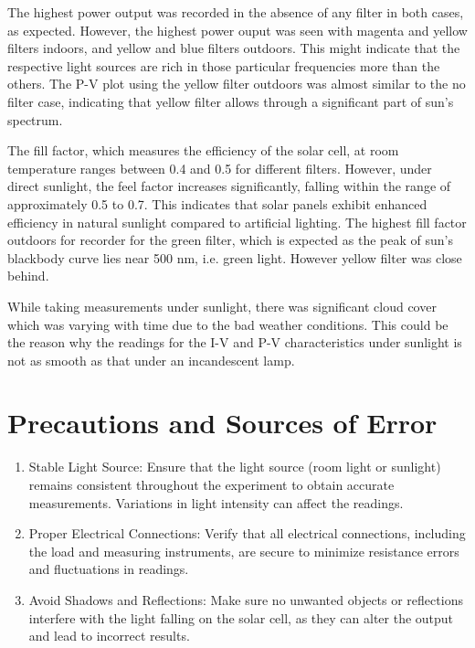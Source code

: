 The highest power output was recorded in the
absence of any filter in both cases, as expected. 
However, the highest power ouput was seen with magenta and yellow filters indoors, and yellow and blue filters outdoors. This might indicate that the respective light sources are rich in those particular frequencies more than the others. The P-V plot using the yellow filter outdoors was almost similar to the no filter case, indicating that yellow filter allows through a significant part of sun's spectrum. 

The fill factor, which measures the efficiency of the solar cell, at room temperature ranges between
0.4 and 0.5 for different filters. However, under direct
sunlight, the feel factor increases significantly, falling
within the range of approximately 0.5 to 0.7. This indicates that solar panels exhibit enhanced efficiency in natural sunlight compared to artificial lighting. The highest fill factor outdoors for recorder for the green filter, which is expected as the peak of sun's blackbody curve lies near 500 nm, i.e. green light. However yellow filter was close behind. 

While taking measurements under sunlight, there was significant cloud cover which was varying with time due to the bad weather conditions. This could be the reason why the readings for the I-V and P-V characteristics under sunlight is not as smooth as that under an incandescent lamp.

\section{Precautions and Sources of Error}

    \begin{enumerate}
        \item Stable Light Source: Ensure that the light
        source (room light or sunlight) remains consistent
        throughout the experiment to obtain accurate measurements. Variations in light intensity can affect
        the readings.
        \item Proper Electrical Connections: Verify that all
        electrical connections, including the load and measuring instruments, are secure to minimize resistance errors and fluctuations in readings.
        \item Avoid Shadows and Reflections: Make sure no
        unwanted objects or reflections interfere with the
        light falling on the solar cell, as they can alter the
        output and lead to incorrect results.
        
    \end{enumerate}